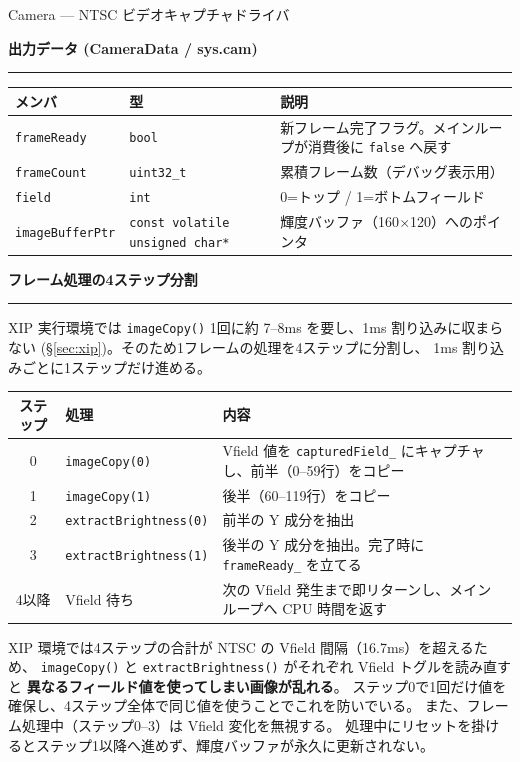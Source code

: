 \documentclass[a4paper,11pt,dvipdfmx]{jsarticle}
\makeatletter
\newcommand{\apisection}[1]{%
  \par\addvspace{4mm}%
  {\normalsize\bfseries\color{headerblue} #1}%
  \par\vspace{-1mm}%
  {\color{accentblue!40}\rule{\linewidth}{0.5pt}}%
  \par\nobreak\vspace{2mm}%
  \@afterheading
}
\makeatother
\begin{document}
\begin{apibox}{Camera --- NTSC ビデオキャプチャドライバ}
\apisection{出力データ (CameraData / sys.cam)}

\begin{tabularx}{\textwidth}{l l X}
\toprule
\textbf{メンバ} & \textbf{型} & \textbf{説明} \\
\midrule
\texttt{frameReady}     & \texttt{bool}     & 新フレーム完了フラグ。メインループが消費後に \texttt{false} へ戻す \\
\texttt{frameCount}     & \texttt{uint32\_t}& 累積フレーム数（デバッグ表示用） \\
\texttt{field}          & \texttt{int}      & 0=トップ / 1=ボトムフィールド \\
\texttt{imageBufferPtr} & \texttt{const volatile unsigned char*} & 輝度バッファ（160$\times$120）へのポインタ \\
\bottomrule
\end{tabularx}

\apisection{フレーム処理の4ステップ分割}

XIP 実行環境では \texttt{imageCopy()} 1回に約 7--8ms を要し、1ms 割り込みに収まらない
(\hyperref[sec:xip]{§\ref*{sec:xip}})。そのため1フレームの処理を4ステップに分割し、
1ms 割り込みごとに1ステップだけ進める。

\begin{tabularx}{\textwidth}{c l X}
\toprule
\textbf{ステップ} & \textbf{処理} & \textbf{内容} \\
\midrule
0 & \texttt{imageCopy(0)}         & Vfield 値を \texttt{capturedField\_} にキャプチャし、前半（0--59行）をコピー \\
1 & \texttt{imageCopy(1)}         & 後半（60--119行）をコピー \\
2 & \texttt{extractBrightness(0)} & 前半の Y 成分を抽出 \\
3 & \texttt{extractBrightness(1)} & 後半の Y 成分を抽出。完了時に \texttt{frameReady\_} を立てる \\
4以降 & Vfield 待ち              & 次の Vfield 発生まで即リターンし、メインループへ CPU 時間を返す \\
\bottomrule
\end{tabularx}

\begin{notebox}
XIP 環境では4ステップの合計が NTSC の Vfield 間隔（16.7ms）を超えるため、
\texttt{imageCopy()} と \texttt{extractBrightness()} がそれぞれ Vfield トグルを読み直すと
\textbf{異なるフィールド値を使ってしまい画像が乱れる}。
ステップ0で1回だけ値を確保し、4ステップ全体で同じ値を使うことでこれを防いでいる。
また、フレーム処理中（ステップ0--3）は Vfield 変化を無視する。
処理中にリセットを掛けるとステップ1以降へ進めず、輝度バッファが永久に更新されない。
\end{notebox}


\end{apibox}
\end{document}
